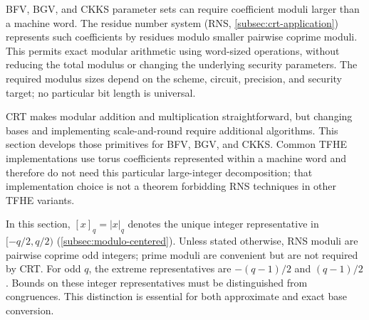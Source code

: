 BFV, BGV, and CKKS parameter sets can require coefficient moduli larger than a machine word. The residue number system (RNS, \autoref{subsec:crt-application}) represents such coefficients by residues modulo smaller pairwise coprime moduli. This permits exact modular arithmetic using word-sized operations, without reducing the total modulus or changing the underlying security parameters. The required modulus sizes depend on the scheme, circuit, precision, and security target; no particular bit length is universal.

CRT makes modular addition and multiplication straightforward, but changing bases and implementing scale-and-round require additional algorithms. This section develops those primitives for BFV, BGV, and CKKS. Common TFHE implementations use torus coefficients represented within a machine word and therefore do not need this particular large-integer decomposition; that implementation choice is not a theorem forbidding RNS techniques in other TFHE variants.

In this section, $[x]_q=|x|_q$ denotes the unique integer representative in $[-q/2,q/2)$ (\autoref{subsec:modulo-centered}). Unless stated otherwise, RNS moduli are pairwise coprime odd integers; prime moduli are convenient but are not required by CRT. For odd $q$, the extreme representatives are $-(q-1)/2$ and $(q-1)/2$. Bounds on these integer representatives must be distinguished from congruences. This distinction is essential for both approximate and exact base conversion.


